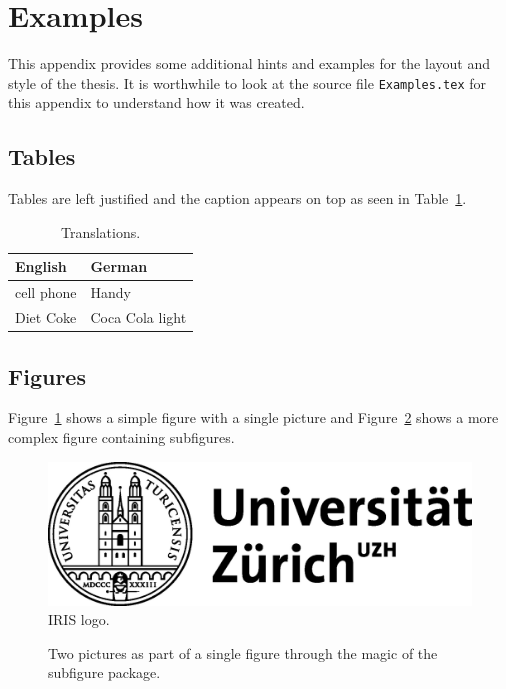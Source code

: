 \section{Examples}
\label{s:Examples}

This appendix provides some additional hints and examples for the
layout and style of the thesis. It is worthwhile to look at the source
file \verb|Examples.tex| for this appendix to understand how it was
created.



\subsection{Tables}

Tables are left justified and the caption appears on top as seen in
Table~\ref{t:Translations}.

\begin{table}[ht] %
\caption[Translations]{\label{t:Translations}Translations.}
\centering
\begin{tabular}{ll}
\hline
\textbf{English} & \textbf{German}\\
\hline
cell phone       & Handy\\
Diet Coke        & Coca Cola light\\
\hline
\end{tabular}
\end{table}



\subsection{Figures}

Figure~\ref{f:IRISlogo} shows a simple figure with a single picture
and Figure~\ref{f:SubfigureExample} shows a more complex figure
containing subfigures.

\begin{figure}[ht]
\centering
\includegraphics[width=.6\linewidth]{files/UZHlogo}
\caption[IRIS logo]{\label{f:IRISlogo}IRIS logo.}
\end{figure}

\begin{figure}[ht]
\centering
{}\quad
{}
\caption[Subfigure example]{\label{f:SubfigureExample}Two pictures as
  part of a single figure through the magic of the subfigure package.}
\end{figure}



